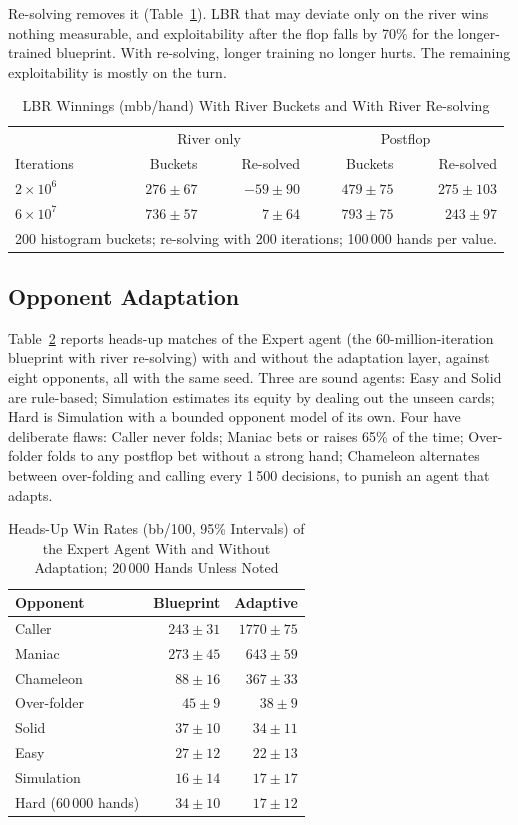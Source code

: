 \documentclass{ieeeaccess}
\newcommand{\bbh}{bb/100}
\newcommand{\mbb}{mbb/hand}
\begin{document}
Re-solving removes it (Table~\ref{tab:resolve}). LBR that may deviate only on the river wins
nothing measurable, and exploitability after the flop falls by 70\% for the longer-trained
blueprint. With re-solving, longer training no longer hurts. The remaining exploitability is
mostly on the turn.

\begin{table}[t]
\caption{LBR Winnings (\mbb) With River Buckets and With River Re-solving}
\label{tab:resolve}
\centering
\begin{tabular}{lrrrr}
\hline
 & \multicolumn{2}{c}{River only} & \multicolumn{2}{c}{Postflop} \\
Iterations & Buckets & Re-solved & Buckets & Re-solved \\
\hline
$2\times10^6$ & $276\pm67$ & $-59\pm90$ & $479\pm75$ & $275\pm103$ \\
$6\times10^7$ & $736\pm57$ & $7\pm64$ & $793\pm75$ & $243\pm97$ \\
\hline
\multicolumn{5}{p{0.9\columnwidth}}{\footnotesize 200 histogram buckets; re-solving with 200
iterations; 100\,000 hands per value.}
\end{tabular}
\end{table}

\subsection{Opponent Adaptation}
\label{sec:results-adaptation}
Table~\ref{tab:adapt} reports heads-up matches of the Expert agent (the 60-million-iteration
blueprint with river re-solving) with and without the adaptation layer, against eight opponents,
all with the same seed. Three are sound agents: Easy and Solid are rule-based; Simulation
estimates its equity by dealing out the unseen cards; Hard is Simulation with a bounded opponent
model of its own. Four have deliberate flaws: Caller never folds; Maniac bets or raises 65\% of the
time; Over-folder folds to any postflop bet without a strong hand; Chameleon alternates between
over-folding and calling every 1\,500 decisions, to punish an agent that adapts.

\begin{table}[t]
\caption{Heads-Up Win Rates (\bbh, 95\% Intervals) of the Expert Agent With and Without
Adaptation; 20\,000 Hands Unless Noted}
\label{tab:adapt}
\centering
\begin{tabular}{lrr}
\hline
Opponent & Blueprint & Adaptive \\
\hline
Caller & $243\pm31$ & $1770\pm75$ \\
Maniac & $273\pm45$ & $643\pm59$ \\
Chameleon & $88\pm16$ & $367\pm33$ \\
Over-folder & $45\pm9$ & $38\pm9$ \\
Solid & $37\pm10$ & $34\pm11$ \\
Easy & $27\pm12$ & $22\pm13$ \\
Simulation & $16\pm14$ & $17\pm17$ \\
Hard (60\,000 hands) & $34\pm10$ & $17\pm12$ \\
\hline
\end{tabular}
\end{table}
\end{document}
